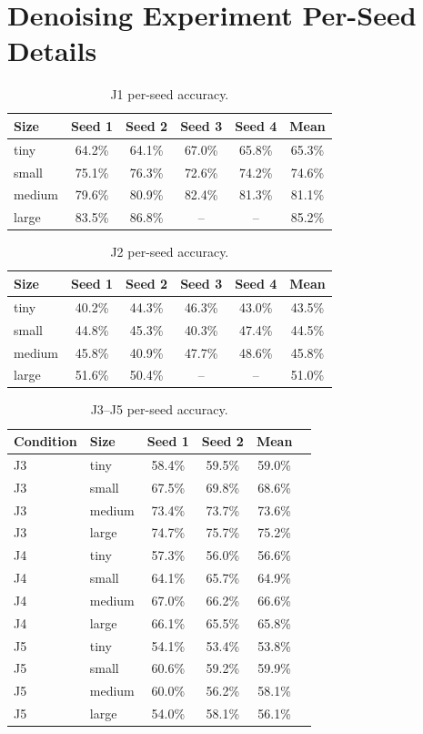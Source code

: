\documentclass[10pt]{article} %
\begin{document}
\section{Denoising Experiment Per-Seed Details}
\label{app:seeds}

\begin{table}[t]
\caption{J1 per-seed accuracy.}
\label{tab:j1_seeds}
\centering
\begin{tabular}{lccccc}
\toprule
Size & Seed 1 & Seed 2 & Seed 3 & Seed 4 & Mean \\
\midrule
tiny & 64.2\% & 64.1\% & 67.0\% & 65.8\% & 65.3\% \\
small & 75.1\% & 76.3\% & 72.6\% & 74.2\% & 74.6\% \\
medium & 79.6\% & 80.9\% & 82.4\% & 81.3\% & 81.1\% \\
large & 83.5\% & 86.8\% & -- & -- & 85.2\% \\
\bottomrule
\end{tabular}
\end{table}

\begin{table}[t]
\caption{J2 per-seed accuracy.}
\label{tab:j2_seeds}
\centering
\begin{tabular}{lccccc}
\toprule
Size & Seed 1 & Seed 2 & Seed 3 & Seed 4 & Mean \\
\midrule
tiny & 40.2\% & 44.3\% & 46.3\% & 43.0\% & 43.5\% \\
small & 44.8\% & 45.3\% & 40.3\% & 47.4\% & 44.5\% \\
medium & 45.8\% & 40.9\% & 47.7\% & 48.6\% & 45.8\% \\
large & 51.6\% & 50.4\% & -- & -- & 51.0\% \\
\bottomrule
\end{tabular}
\end{table}

\begin{table}[t]
\caption{J3--J5 per-seed accuracy.}
\label{tab:j345_seeds}
\centering
\begin{tabular}{llcccc}
\toprule
Condition & Size & Seed 1 & Seed 2 & Mean \\
\midrule
J3 & tiny & 58.4\% & 59.5\% & 59.0\% \\
J3 & small & 67.5\% & 69.8\% & 68.6\% \\
J3 & medium & 73.4\% & 73.7\% & 73.6\% \\
J3 & large & 74.7\% & 75.7\% & 75.2\% \\
\midrule
J4 & tiny & 57.3\% & 56.0\% & 56.6\% \\
J4 & small & 64.1\% & 65.7\% & 64.9\% \\
J4 & medium & 67.0\% & 66.2\% & 66.6\% \\
J4 & large & 66.1\% & 65.5\% & 65.8\% \\
\midrule
J5 & tiny & 54.1\% & 53.4\% & 53.8\% \\
J5 & small & 60.6\% & 59.2\% & 59.9\% \\
J5 & medium & 60.0\% & 56.2\% & 58.1\% \\
J5 & large & 54.0\% & 58.1\% & 56.1\% \\
\bottomrule
\end{tabular}
\end{table}
\end{document}
